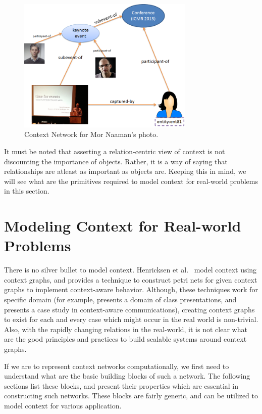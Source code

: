 \begin{figure}[h]
\centering
\includegraphics[width=0.75\textwidth]{media/chapter2/naaman-4.png}
\caption{Context Network for Mor Naaman's photo.}
\label{fig:context-network}
\end{figure}

It must be noted that asserting a relation-centric view of context is not discounting the importance of objects. Rather, it is a way of saying that relationships are atleast as important as objects are. Keeping this in mind, we will see what are the primitives required to model context for real-world problems in this section.

\section{Modeling Context for Real-world Problems}

There is no silver bullet to model context. Henricksen et al.\ \cite{henricksen2002modeling} model context using context graphs, and \cite{reignier2007context} provides a technique to construct petri nets for given context graphs to implement context-aware behavior. Although, these techniques work for specific domain (for example, \cite{reignier2007context} presents a domain of class presentations, and \cite{henricksen2002modeling} presents a case study in context-aware communications), creating context graphs to exist for each and every case which might occur in the real world is non-trivial. Also, with the rapidly changing relations in the real-world, it is not clear what are the good principles and practices to build scalable systems around context graphs.

If we are to represent context networks computationally, we first need to understand what are the basic building blocks of such a network. The following sections list these blocks, and present their properties which are essential in constructing such networks. These blocks are fairly generic, and can be utilized to model context for various application.

